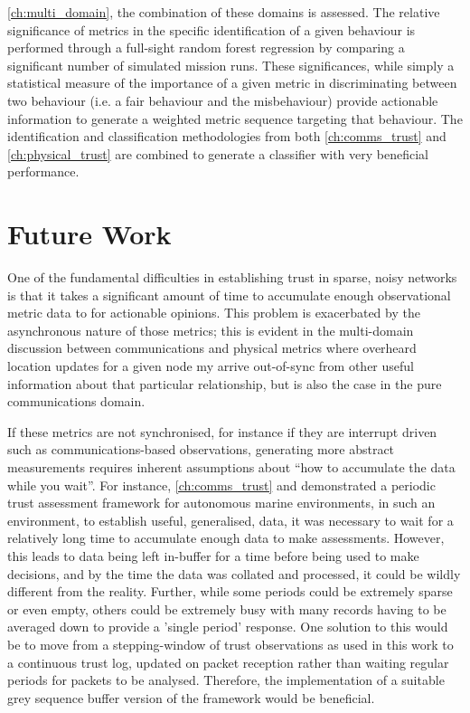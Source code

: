 \autoref{ch:multi_domain}, the combination of these domains is assessed.
The relative significance of metrics in the specific identification of a given behaviour is performed through a full-sight random forest regression by comparing a significant number of simulated mission runs.
These significances, while simply a statistical measure of the importance of a given metric in discriminating between two behaviour (i.e. a fair behaviour and the misbehaviour) provide actionable information to generate a weighted metric sequence targeting that behaviour.
The identification and classification methodologies from both \autoref{ch:comms_trust} and \autoref{ch:physical_trust} are combined to generate a classifier with very beneficial performance.


\section{Future Work}
One of the fundamental difficulties in establishing trust in sparse, noisy networks is that it takes a significant amount of time to accumulate enough observational metric data to for actionable opinions.
This problem is exacerbated by the asynchronous nature of those metrics; this is evident in the multi-domain discussion between communications and physical metrics where overheard location updates for a given node my arrive out-of-sync from other useful information about that particular relationship, but is also the case in the pure communications domain.

If these metrics are not synchronised, for instance if they are interrupt driven such as communications-based observations, generating more abstract measurements requires inherent assumptions about ``how to accumulate the data while you wait''. 
For instance, \autoref{ch:comms_trust} and \cite{Bolster2015} demonstrated a periodic trust assessment framework for autonomous marine environments, in such an environment, to establish useful, generalised, data, it was necessary to wait for a relatively long time to accumulate enough data to make assessments.
However, this leads to data being left in-buffer for a time before being used to make decisions, and by the time the data was collated and processed, it could be wildly different from the reality. 
Further, while some periods could be extremely sparse or even empty, others could be extremely busy with many records having to be averaged down to provide a 'single period' response. 
One solution to this would be to move from a stepping-window of trust observations as used in this work to a continuous trust log, updated on packet reception rather than waiting regular periods for packets to be analysed.
Therefore, the implementation of a suitable grey sequence buffer version of the framework would be beneficial.

